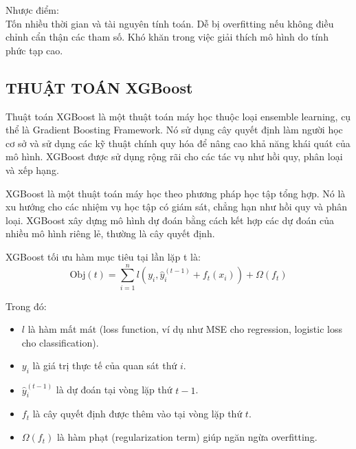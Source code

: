 \documentclass{article}
\begin{document}
\begin{multicols}{2}
       Nhược điểm:\\
       Tốn nhiều thời gian và tài nguyên tính toán.
       Dễ bị overfitting nếu không điều chỉnh cẩn thận các tham số.
       Khó khăn trong việc giải thích mô hình do tính phức tạp cao.\\

       \subsection{THUẬT TOÁN XGBoost}

       Thuật toán XGBoost là một thuật toán máy học thuộc loại ensemble learning, cụ thể là Gradient Boosting Framework. Nó sử dụng cây quyết định làm người học  cơ sở và sử dụng các kỹ thuật chính quy hóa để nâng cao khả năng khái quát của mô hình. XGBoost được sử dụng rộng rãi cho các tác vụ như hồi quy, phân loại và xếp hạng.
      
       XGBoost là một thuật toán máy học theo phương pháp học tập tổng hợp. Nó là xu hướng cho các nhiệm vụ học tập có giám sát, chẳng hạn như hồi quy và phân loại. XGBoost xây dựng mô hình dự đoán bằng cách kết hợp các dự đoán của nhiều mô hình riêng lẻ, thường là cây quyết định.
      
       XGBoost tối ưu hàm mục tiêu tại lần lặp t là:
      \begin{equation}
      \text{Obj}(t) = \sum_{i=1}^{n} l(y_i, \hat{y}_i^{(t-1)} + f_t(x_i)) + \Omega(f_t)
      \end{equation}
      
      Trong đó:
      \begin{itemize}
          \item \( l \) là hàm mất mát (loss function, ví dụ như MSE cho regression, logistic loss cho classification).
          \item \( y_i \) là giá trị thực tế của quan sát thứ \( i \).
          \item \( \hat{y}_i^{(t-1)} \) là dự đoán tại vòng lặp thứ \( t-1 \).
          \item \( f_t \) là cây quyết định được thêm vào tại vòng lặp thứ \( t \).
          \item \( \Omega(f_t) \) là hàm phạt (regularization term) giúp ngăn ngừa overfitting.
      \end{itemize}
      

\end{multicols}
\end{document}
